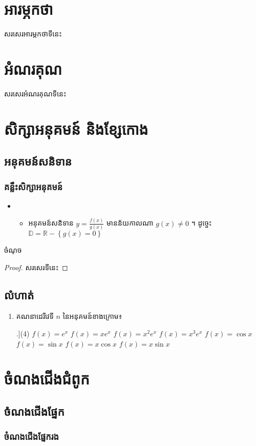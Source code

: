 \documentclass[12pt,a4paper]{book}
\begin{document}
	\frontmatter
	\tableofcontents
	\clearpage
	\chapter{អារម្ភកថា}
	សរសេរអារម្ភកថាទីនេះ
	\chapter{អំណរគុណ}
	សរសេរអំណរគុណទីនេះ
	\mainmatter
	\chapter{សិក្សាអនុគមន៍​ និងខ្សែកោង}
	\section{អនុគមន៍សនិទាន}
	\subsection{គន្លឹះសិក្សាអនុគមន៍}
	\begin{itemize}
		\item {}
		\begin{itemize}
			\item \koc អនុគមន៍សនិទាន $y=\frac{f(x)}{g(x)}$ មានន័យកាលណា $g(x)\neq0$ ។ ដូច្នេះ $\mathbb{D}=\mathbb{R}-\left\lbrace g(x)=0\right\rbrace$
		\end{itemize}
	\end{itemize}
\begin{thm}
	ចំណុច
	
\end{thm}
\begin{proof}
	សរសេរទីនេះ
\end{proof}
\section*{លំហាត់}
\begin{enumerate}
	\item គណនាដេរីវេទី $ n $ នៃអនុគមន៍ខាងក្រោម៖
	\begin{tasks}[counter-format=tsk[k].](4)
		\task $ f(x)=e^x $
		\task $ f(x)=x e^x $
		\task $ f(x)=x^2 e^x $
		\task $ f(x)=x^3 e^x $
		\task $ f(x)=\cos x $
		\task $ f(x)=\sin x $
		\task $ f(x)=x\cos x $
		\task $ f(x)=x\sin x $
	\end{tasks}
\end{enumerate}
\appendix
\chapter{ចំណងជើងជំពូក}
\section{ចំណងជើងផ្នែក}
\subsection{ចំណងជើងផ្នែករង}
\backmatter
\begin{thebibliography}{3}
	
\end{thebibliography}
\end{document}
